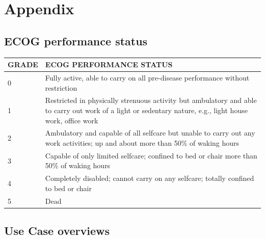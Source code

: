 
\section{Appendix}

\subsection{ECOG performance status}


\begin{tabular}{|l p{8cm}|}
\hline
GRADE&	ECOG PERFORMANCE STATUS\\
\hline\hline
0	&Fully active, able to carry on all pre-disease performance without restriction\\
1	&Restricted in physically strenuous activity but ambulatory and able to carry out work of a light or sedentary nature, e.g., light house work, office work\\
2	&Ambulatory and capable of all selfcare but unable to carry out any work activities; up and about more than 50\% of waking hours\\
3	&Capable of only limited selfcare; confined to bed or chair more than 50\% of waking hours\\
4	&Completely disabled; cannot carry on any selfcare; totally confined to bed or chair\\
5	&Dead\\
\hline
\end{tabular}
\label{tab:ecog}

\subsection{Use Case overviews}

